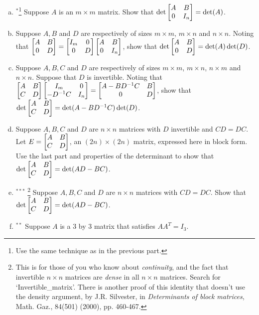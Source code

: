\begin{prob}
\begin{enumerate}[a)]
\item$^\ast$\footnote{Use the same technique as in the previous part.} Suppose $A$ is an $m\times m$  matrix. Show that $\det \bmatrix A&B\\0&I_n\endbmatrix= \det(A)$. 
\medskip
% 
\item Suppose $A, B$ and $D$ are respectively of sizes $m\times m$,   $m \times n$ and $n \times n$. Noting that $ \bmatrix A&B\\0&D\endbmatrix =\bmatrix I_m&0\\0&D\endbmatrix\bmatrix A&B\\0&I_n\endbmatrix$, show that $\det \bmatrix A&B\\0&D\endbmatrix= \det(A) \det(D)$. 
\medskip
%
\item\sov Suppose $A, B, C$ and $D$ are respectively of sizes $m\times m$,   $m \times n$, $n \times m$ and $n \times n$. Suppose that $D$ is invertible. Noting that $ \bmatrix A&B\\C&D\endbmatrix \bmatrix I_m&0\\-D^{-1}C&I_n\endbmatrix  =\bmatrix A-BD^{-1}C&B\\0&D\endbmatrix$, show that $\det \bmatrix A&B\\C&D\endbmatrix= \det (A-BD^{-1}C) \det(D)$.
\medskip
% 
\item Suppose $A, B, C$ and $D$ are $n\times n$ matrices with $D$ invertible and  $CD=DC$. Let $E=\bmatrix A&B\\C&D\endbmatrix$,  an $(2n)\times (2n)$ matrix, expressed here in block form. Use the last part and properties of the determinant to show that $\det \bmatrix A&B\\C&D\endbmatrix= \det (AD-BC)$.  \medskip
%
\item$^{\ast\ast\ast}$ \footnote{This is for those of you who know about {\it continuity}, and the fact that invertible $n\times n$ matrices are {\it dense} in all $n\times n$ matrices. Search for `Invertible\_matrix'. There is another proof of this identity that doesn't use the density argument, by J.R. Silvester, in {\it Determinants of block matrices}, Math. Gaz., 84(501) (2000), pp. 460-467.} Suppose $A, B, C$ and $D$ are $n\times n$ matrices with  $CD=DC$. Show that $\det \bmatrix A&B\\C&D\endbmatrix= \det (AD-BC)$.  \medskip
%
\item$^{\ast\ast}$ Suppose $A$ is a 3 by 3 matrix that satisfies $AA^T=I_3$. \medskip


\end{enumerate}
\end{prob}
